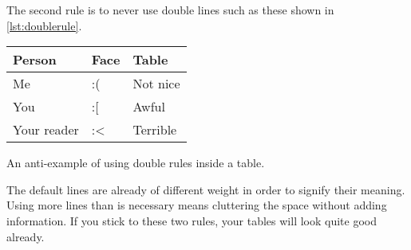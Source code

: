 The second rule is to never use double lines such as these shown in
\autoref{lst:doublerule}.
\begin{listing}
  \begin{chktexignore}
  \begin{example}[examplewidth=0.6\linewidth, vertical_mode]
\begin{tabular}{lll}
  \toprule[0.1cm]
  \toprule
  Person      & Face & Table    \\
  \midrule
  \midrule
  Me          & :(   & Not nice \\
  You         & :[   & Awful    \\
  Your reader & :<   & Terrible \\
  \bottomrule
  \bottomrule[0.1cm]
\end{tabular}
\end{example}
\end{chktexignore}
  \caption{An anti-example of using double rules inside a table.}\label{lst:doublerule}
\end{listing}
The default lines are already of different weight in order to signify
their meaning. Using more lines than is necessary means cluttering the space
without adding information. If you stick to these two rules, your tables will
look quite good already.

